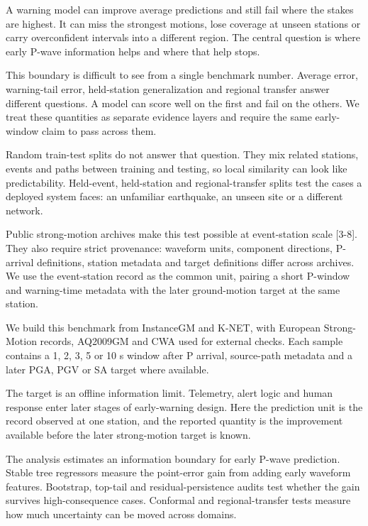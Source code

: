 \documentclass[
  10pt,
]{article}
\begin{document}
A warning model can improve average predictions and still fail where the
stakes are highest. It can miss the strongest motions, lose coverage at
unseen stations or carry overconfident intervals into a different
region. The central question is where early P-wave information helps and
where that help stops.

This boundary is difficult to see from a single benchmark number.
Average error, warning-tail error, held-station generalization and
regional transfer answer different questions. A model can score well on
the first and fail on the others. We treat these quantities as separate
evidence layers and require the same early-window claim to pass across
them.

Random train-test splits do not answer that question. They mix related
stations, events and paths between training and testing, so local
similarity can look like predictability. Held-event, held-station and
regional-transfer splits test the cases a deployed system faces: an
unfamiliar earthquake, an unseen site or a different network.

Public strong-motion archives make this test possible at event-station
scale {[}3-8{]}. They also require strict provenance: waveform units,
component directions, P-arrival definitions, station metadata and target
definitions differ across archives. We use the event-station record as
the common unit, pairing a short P-window and warning-time metadata with
the later ground-motion target at the same station.

We build this benchmark from InstanceGM and K-NET, with European
Strong-Motion records, AQ2009GM and CWA used for external checks. Each
sample contains a 1, 2, 3, 5 or 10 s window after P arrival, source-path
metadata and a later PGA, PGV or SA target where available.

The target is an offline information limit. Telemetry, alert logic and
human response enter later stages of early-warning design. Here the
prediction unit is the record observed at one station, and the reported
quantity is the improvement available before the later strong-motion
target is known.

The analysis estimates an information boundary for early P-wave
prediction. Stable tree regressors measure the point-error gain from
adding early waveform features. Bootstrap, top-tail and
residual-persistence audits test whether the gain survives
high-consequence cases. Conformal and regional-transfer tests measure
how much uncertainty can be moved across domains.
\end{document}
